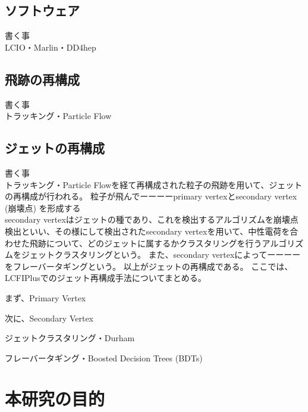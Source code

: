 \subsection{ソフトウェア} \label{Intro:SoftERILC:Software}

書く事\\
LCIO・Marlin・DD4hep\\


\subsection{飛跡の再構成} \label{Intro:SoftERILC:ParticleReconstruction}

書く事\\
トラッキング・Particle Flow\\

\subsection{ジェットの再構成} \label{Intro:SoftERILC:JetReconstruction}

書く事\\
トラッキング・Particle Flowを経て再構成された粒子の飛跡を用いて、ジェットの再構成が行われる。
粒子が飛んでーーーーprimary vertexとsecondary vertex　(崩壊点) を形成する\\
secondary vertexはジェットの種であり、これを検出するアルゴリズムを崩壊点検出といい、その様にして検出されたsecondary vertexを用いて、中性電荷を合わせた飛跡について、どのジェットに属するかクラスタリングを行うアルゴリズムをジェットクラスタリングという。
また、secondary vertexによってーーーーをフレーバータギングという。
以上がジェットの再構成である。
ここでは、LCFIPlus\cite{LCFIPlusPaper}でのジェット再構成手法についてまとめる。

まず、Primary Vertex

次に、Secondary Vertex

ジェットクラスタリング・Durham

フレーバータギング・Boosted Decision Trees (BDTs)

\section{本研究の目的} \label{Intro:Purpose}

